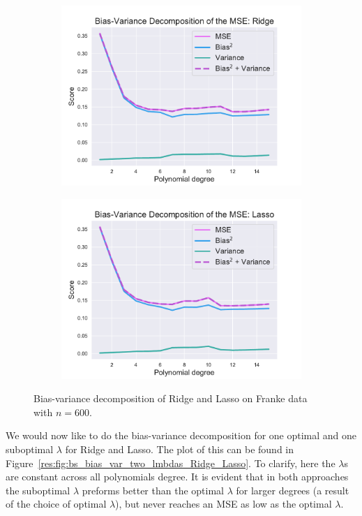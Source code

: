\documentclass[twocolumn,english,notitlepage]{article}
\begin{document}
            \begin{figure}[ht]
                \begin{subfigure}{\linewidth}
                    \centering
                    \includegraphics[width=.9\linewidth]{BS_Bias_var_decomp_Ridge.pdf}
                \end{subfigure}
                \begin{subfigure}{\linewidth}
                    \centering
                    \includegraphics[width=.9\linewidth]{BS_Bias_var_decomp_Lasso.pdf}
                \end{subfigure}
                \caption{Bias-variance decomposition of Ridge and Lasso on Franke data with $n=600$.}
                \label{res:fig:bs_bias_var_Ridge_Lasso}
            \end{figure}
    

            We would now like to do the bias-variance decomposition for one optimal and one suboptimal $\lambda$ for Ridge and Lasso. The plot of this can be found in Figure~\ref{res:fig:bs_bias_var_two_lmbdas_Ridge_Lasso}. To clarify, here the $\lambda$s are constant across all polynomials degree. It is evident that in both approaches the suboptimal $\lambda$ preforms better than the optimal $\lambda$ for larger degrees (a result of the choice of optimal $\lambda$), but never reaches an MSE as low as the optimal $\lambda$. 
\end{document}
